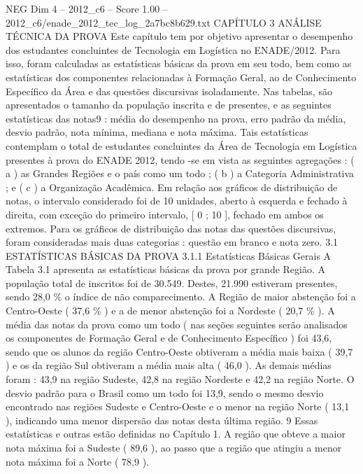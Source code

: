 \begin{textsample}{NEG Dim 4 – 2012\_c6 – Score 1.00 – 2012\_c6/enade\_2012\_tec\_log\_2a7bc8b629.txt}  \label{ex:f4_neg_238}
CAPÍTULO 3 ANÁLISE TÉCNICA DA PROVA Este capítulo tem por objetivo apresentar o desempenho dos estudantes concluintes de Tecnologia em Logística no ENADE/2012.
Para isso, foram calculadas as estatísticas básicas da prova em seu todo, bem como as estatísticas dos componentes relacionadas à Formação Geral, ao de Conhecimento Específico da Área e das questões discursivas isoladamente.
Nas tabelas, são apresentados o tamanho da população inscrita e de presentes, e as seguintes estatísticas das notas9 : média do desempenho na prova, erro padrão da média, desvio padrão, nota mínima, mediana e nota máxima.
Tais estatísticas contemplam o total de estudantes concluintes da Área de Tecnologia em Logística presentes à prova do ENADE 2012, tendo -se em vista as seguintes agregações : ( a ) as Grandes Regiões e o país como um todo ; ( b ) a Categoria Administrativa ; e ( c ) a Organização Acadêmica.
Em relação aos gráficos de distribuição de notas, o intervalo considerado foi de 10 unidades, aberto à esquerda e fechado à direita, com exceção do primeiro intervalo, [ 0 ; 10 ], fechado em ambos os extremos.
Para os gráficos de distribuição das notas das questões discursivas, foram consideradas mais duas categorias : questão em branco e nota zero. 3.1 ESTATÍSTICAS BÁSICAS DA PROVA 3.1.1 Estatísticas Básicas Gerais A Tabela 3.1 apresenta as estatísticas básicas da prova por grande Região.
A população total de inscritos foi de 30.549.
Destes, 21.990 estiveram presentes, sendo 28,0 \% o índice de não comparecimento.
A Região de maior abstenção foi a Centro-Oeste ( 37,6 \% ) e a de menor abstenção foi a Nordeste ( 20,7 \% ).
A média das notas da prova como um todo ( nas seções seguintes serão analisados os componentes de Formação Geral e de Conhecimento Específico ) foi 43,6, sendo que os alunos da região Centro-Oeste obtiveram a média mais baixa ( 39,7 ) e os da região Sul obtiveram a média mais alta ( 46,0 ).
As demais médias foram : 43,9 na região Sudeste, 42,8 na região Nordeste e 42,2 na região Norte.
O desvio padrão para o Brasil como um todo foi 13,9, sendo o mesmo desvio encontrado nas regiões Sudeste e Centro-Oeste e o menor na região Norte ( 13,1 ), indicando uma menor dispersão das notas desta última região. 9 Essas estatísticas e outras estão definidas no Capítulo 1.
A região que obteve a maior nota máxima foi a Sudeste ( 89,6 ), ao passo que a região que atingiu a menor nota máxima foi a Norte ( 78,9 ).

\end{textsample}
